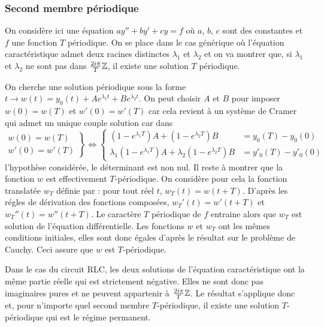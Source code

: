 \subsubsection{Second membre périodique}
On considère ici une équation $ay'' + by' + cy = f$ où $a$, $b$, $c$ sont des constantes et $f$ une fonction $T$ périodique. On se place dans le cas générique où l'équation caractéristique admet deux racines distinctes $\lambda_1$ et $\lambda_2$ et on va montrer que, si $\lambda_1$ et $\lambda_2$ ne sont pas dans $\frac{2i\pi}{T}\mathbb{Z}$, il existe une solution $T$ périodique.
\begin{demo}
 On cherche une solution périodique sous la forme $t\rightarrow w(t)= y_0(t) + Ae^{\lambda_1 t} + Be^{\lambda_2 t}$. On peut choisir $A$ et $B$ pour imposer $w(0)=w(T)$ et $w'(0)=w'(T)$ car cela revient à un système de Cramer qui admet un unique couple solution car dans
\begin{displaymath}
 \left. 
\begin{aligned}
 w(0)=w(T)\\
 w'(0)=w'(T)
\end{aligned}
\right\rbrace 
\Leftrightarrow
\left\lbrace 
\begin{aligned}
 (1-e^{\lambda_1 T})A + (1-e^{\lambda_2 T})B &= y_0(T)-y_0(0)\\
 \lambda_1(1-e^{\lambda_1 T})A + \lambda_2(1-e^{\lambda_2 T})B &= y'_0(T)-y'_0(0)
\end{aligned}
\right. 
\end{displaymath}
l'hypothèse considérée, le déterminant est non nul.\newline
Il reste à montrer que la fonction $w$ est effectivement $T$-périodique. On considère pour cela la fonction translatée $w_T$  définie par : pour tout réel $t$, $w_T(t)=w(t+T)$. D'après les régles de dérivation des fonctions composées, 
$w_T'(t)=w'(t+T)$ et $w_T''(t)=w''(t+T)$. Le caractère $T$ périodique de $f$ entraine alors que $w_T$ est solution de l'équation différentielle. Les fonctions $w$ et $w_T$ ont les mêmes conditions initiales, elles sont donc égales d'après le résultat sur le problème de Cauchy. Ceci assure que $w$ est $T$-périodique.
\end{demo}
Dans le cas du circuit RLC, les deux solutions de l'équation caractéristique ont la même partie réelle qui est strictement négative. Elles ne sont donc pas imaginaires pures et ne peuvent appartenir à $\frac{2i\pi}{T}\mathbb{Z}$. Le résultat s'applique donc et, pour n'importe quel second membre $T$-périodique, il existe une solution $T$-périodique qui est le régime permanent.

